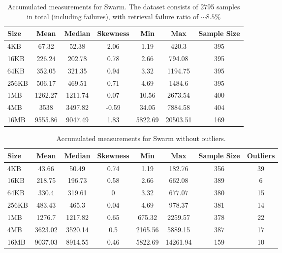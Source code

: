 \begin{table}[H]
\centering
\begin{small}
\caption{Accumulated measurements for Swarm. The dataset consists of 2795 samples in total (including failures), with retrieval failure ratio of $\sim 8.5\%$ }
\begin{tabular}{@{}lcccccc@{}}
\toprule
Size & Mean & Median & Skewness & Min & Max & Sample Size \\ \midrule
4KB & 67.32 & 52.38 & 2.06 & 1.19 & 420.3 & 395\\
16KB & 226.24 & 202.78 & 0.78 & 2.66 & 794.08 & 395\\
64KB & 352.05 & 321.35 & 0.94 & 3.32 & 1194.75 & 395\\
256KB & 506.17 & 469.51 & 0.71 & 4.69 & 1484.6 & 395\\
1MB & 1262.27 & 1211.74 & 0.07 & 10.56 & 2673.54 & 400\\
4MB	& 3538 & 3497.82 & -0.59 & 34.05 & 7884.58 & 404\\
16MB & 9555.86 & 9047.49 & 1.83 & 5822.69 & 20503.51 & 169\\
\bottomrule
\end{tabular}
\end{small}
\end{table}

\begin{table}[H]
\centering
\begin{small}
\caption{Accumulated measurements for Swarm without outliers.}
\begin{tabular}{@{}lccccccc@{}}
\toprule
Size & Mean & Median & Skewness & Min & Max & Sample Size & Outliers \\ \midrule
4KB & 43.66 & 50.49 & 0.74 & 1.19 & 182.76 & 356 & 39\\
16KB & 218.75 & 196.73 & 0.58 & 2.66 & 662.08 & 389 & 6\\
64KB & 330.4 & 319.61 &	0 & 3.32 & 677.07 & 380 & 15\\
256KB & 483.43 & 465.3 & 0.04 & 4.69 & 978.37 & 381 & 14\\
1MB & 1276.7 & 1217.82 & 0.65 & 675.32 & 2259.57 & 378 & 22\\
4MB & 3623.02 & 3520.14 & 0.5 & 2165.56 & 5889.15 & 387 & 17\\
16MB & 9037.03 & 8914.55 & 0.46 & 5822.69 & 14261.94 & 159 & 10\\
\bottomrule
\end{tabular}
\end{small}
\end{table}



